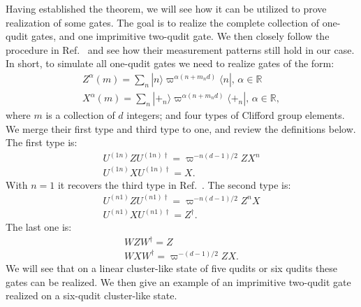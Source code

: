 \documentclass[aps,amsfonts,pra,twocolumn,showpacs]{revtex4-1}
\begin{document}
	Having established the theorem, we will see how it can be utilized to prove realization of some gates. The goal is to realize the complete collection of one-qudit gates, and one imprimitive two-qudit gate. We then closely follow the procedure in Ref.~\cite{Zhou2003} and see how their measurement patterns still hold in our case. In short, to simulate all one-qudit gates we need to realize gates of the form:
		\begin{align}
		Z^\alpha(m) = \sum_n |n\rangle \varpi^{\alpha(n+m_nd)} \langle n|, \, \alpha \in \mathds{R} \\
		X^\alpha(m) = \sum_n |+_n\rangle \varpi^{\alpha(n+m_nd)} \langle +_n|, \, \alpha \in \mathds{R},
		\end{align}
	where $m$ is a collection of $d$ integers; and four types of Clifford group elements. We merge their first type and third type to one, and review the definitions below. The first type is:
		\begin{align}
		U^{(1n)}ZU^{(1n)\dagger} = \varpi^{-n(d-1)/2} ZX^n \\
		U^{(1n)}XU^{(1n)\dagger} = X.
		\end{align}
	With $n=1$ it recovers the third type in Ref.~\cite{Zhou2003}. The second type is:
		\begin{align}
		U^{(n1)}ZU^{(n1)\dagger} = \varpi^{-n(d-1)/2} Z^nX \\
		U^{(n1)}XU^{(n1)\dagger} = Z^\dagger.
		\end{align}
	The last one is:
		\begin{align}
		WZW^\dagger = Z \\
		WXW^\dagger = \varpi^{-(d-1)/2} ZX.
		\end{align}
	We will see that on a linear cluster-like state of five qudits or six qudits these gates can be realized. We then give an example of an imprimitive two-qudit gate realized on a six-qudit cluster-like state.
	
\end{document}

